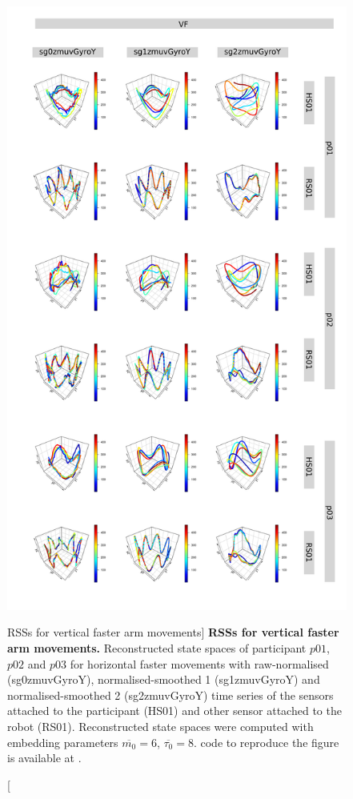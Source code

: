 \begin{figure}
\centering
\includegraphics[height=0.85\textheight]{rss_VF}
\caption
	[RSSs for vertical faster arm movements]{
	{\bf RSSs for vertical faster arm movements.}
	Reconstructed state spaces %
	of participant $p01$, $p02$ and $p03$ for horizontal faster movements 
	with raw-normalised (sg0zmuvGyroY), 
	normalised-smoothed 1 (sg1zmuvGyroY) and 
	normalised-smoothed 2 (sg2zmuvGyroY) time series of the 
	sensors attached to the participant (HS01) and other sensor 
	attached to the robot (RS01).	
	Reconstructed state spaces were computed with 
	embedding parameters $\overline{m_0}=6$, $\overline{\tau_0}=8$.
	\R code to reproduce the figure is available at 
	.
        }
    \label{fig:rss_VF}
\end{figure}







